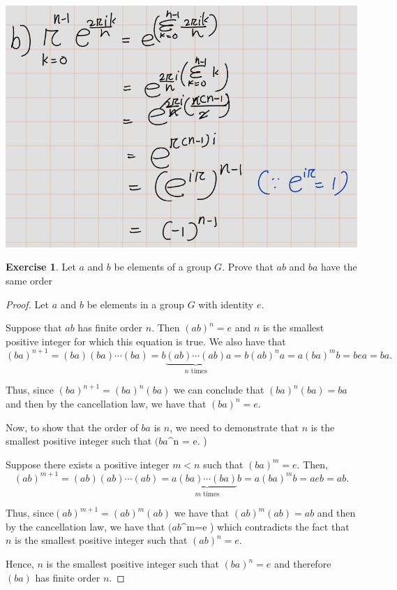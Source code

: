 \documentclass[
]{book}
\theoremstyle{definition}
\theoremstyle{definition}
\theoremstyle{definition}
\newtheorem{exercise}{Exercise}[chapter]
\theoremstyle{definition}
\theoremstyle{remark}
\begin{document}
\includegraphics{figures/ch_2/fig28.png}

\begin{exercise}
\protect\hypertarget{exr:unnamed-chunk-73}{}\label{exr:unnamed-chunk-73}Let \(a\) and \(b\) be elements of a group \(G\). Prove that \(ab\) and \(ba\) have the same order
\end{exercise}

\begin{proof}
Let \(a\) and \(b\) be elements in a group \(G\) with identity \(e\).

Suppose that \(ab\) has finite order \(n\). Then \((ab)^n = e\) and \(n\) is the smallest positive integer for which this equation is true. We also have that \[ (ba)^{n+1} = (ba)(ba) \cdots (ba) = b\underbrace{(ab) \cdots (ab)}_{n \text{ times}}a =b(ab)^na=a(ba)^m b =bea = ba. \]

Thus, since \((ba)^{n+1} = (ba)^n(ba)\) we can conclude that \((ba)^n(ba) = ba\) and then by the cancellation law, we have that \((ba)^n = e.\)

Now, to show that the order of \(ba\) is \(n\), we need to demonstrate that \(n\) is the smallest positive integer such that \((ba\)\^{}n = e. )

Suppose there exists a positive integer \(m < n\) such that \((ba)^m = e.\)
Then,\[
(ab)^{m+1} =(ab)(ab)\cdots(ab)=a\underbrace{(ba)\cdots(ba)}_{m \text{ times}}b=a(ba)^m b=aeb= ab.
\]

Thus, since\((ab)^{m+1} =(ab)^m(ab)\)
we have that
\((ab)^m(ab)= ab\)
and then by the cancellation law, we have that
\((ab\)\^{}m=e )
which contradicts the fact that \(n\) is the smallest positive integer such that
\((ab)^n=e.\)

Hence, \(n\) is the smallest positive integer such that
\((ba)^n=e\)
and therefore
\((ba)\) has finite order \(n\).
\end{proof}
\end{document}
